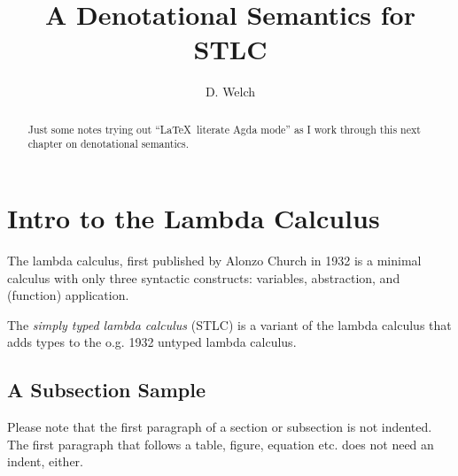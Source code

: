 \documentclass[runningheads]{llncs}
\begin{document}
\title{A Denotational Semantics for STLC}
\author{D. Welch}
\institute{}
\maketitle

\begin{abstract}
Just some notes trying out ``\LaTeX \ literate Agda mode'' as I work through 
this next chapter on denotational semantics.
\end{abstract}

\section{Intro to the Lambda Calculus} 

The lambda calculus, first published by Alonzo Church in 1932 is a minimal calculus
with only three syntactic constructs: variables, abstraction, and (function) 
application. 

The \textit{simply typed lambda calculus} (STLC) is a variant of the lambda calculus
that adds types to the o.g. 1932 untyped lambda calculus.



\subsection{A Subsection Sample}
Please note that the first paragraph of a section or subsection is
not indented. The first paragraph that follows a table, figure,
equation etc. does not need an indent, either.
\end{document}
